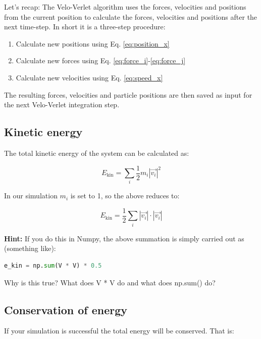 \documentclass{article}
\begin{document}
Let's recap: The Velo-Verlet algorithm uses the forces, velocities and
positions from the current position to calculate the forces, velocities and
positions after the next time-step. In short it is a three-step procedure:

\begin{enumerate}
    \item Calculate new positions using Eq. \ref{eq:position_x}
    \item Calculate new forces using Eq. \ref{eq:force_i}-\ref{eq:force_j}
    \item Calculate new velocities using Eq. \ref{eq:speed_x}
\end{enumerate}

The resulting forces, velocities and particle positions are then saved as input
for the next Velo-Verlet integration step.

\subsection{Kinetic energy}

The total kinetic energy of the system can be calculated as:

\begin{equation}
    E_{\mathrm{kin}} = \sum_i \frac{1}{2} m_i |\vec{v_i}|^2
\end{equation}

In our simulation $m_i$ is set to 1, so the above reduces to:

\begin{equation}
    E_{\mathrm{kin}} = \frac{1}{2} \sum_i |\vec{v_i}| \cdot |\vec{v_i}|
\end{equation}

\textbf{Hint:} If you do this in Numpy, the above summation is simply carried
out as (something like):

\begin{lstlisting}[language=python]
e_kin = np.sum(V * V) * 0.5
\end{lstlisting}

Why is this true? What does V * V do and what does np.sum() do?

\subsection{Conservation of energy}

If your simulation is successful the total energy will be conserved. That is:
\end{document}
